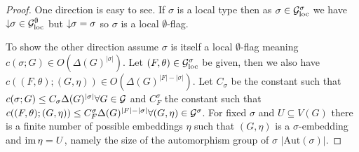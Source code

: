 \begin{proof}
    One direction is easy to see. If $\sigma$ is a local type then as $\sigma\in\mathcal{G}_\mathrm{loc}^\sigma$
    we have ${\downarrow\!\!\sigma}\in\mathcal{G}_\mathrm{loc}^\emptyset$ but ${\downarrow\!\!\sigma}=\sigma$ so
    $\sigma$ is a local $\emptyset$-flag.

    To show the other direction assume $\sigma$ is itself a local $\emptyset$-flag
    meaning $c(\sigma; G) \in O(\Delta(G)^{|\sigma|})$. Let $(F, \theta) \in\mathcal{G}_\mathrm{loc}^\sigma$ be
    given, then we also have\\
    $c((F, \theta); (G, \eta)) \in O(\Delta(G)^{|F|-|\sigma|})$.
    Let $C_\sigma$ be the constant such that\\
    $c(\sigma; G) \leq C_\sigma \Delta(G)^{|\sigma|}\forall G\in\mathcal{G}$ and
    $C_F^\sigma$ the constant such that\\
    $c((F, \theta); (G, \eta)) \leq C_F^\sigma\Delta(G)^{|F|-|\sigma|}\forall
    (G,\eta)\in\mathcal{G}^\sigma$. For fixed $\sigma$ and $U \subseteq V(G)$ there is
    a finite number of possible embeddings $\eta$ such that $(G,\eta)$ is a
    $\sigma$-embedding and $\operatorname{im}\eta=U$, namely the size of the automorphism group of $\sigma$
    $|\mathrm{Aut}(\sigma)|$.


\end{proof}

